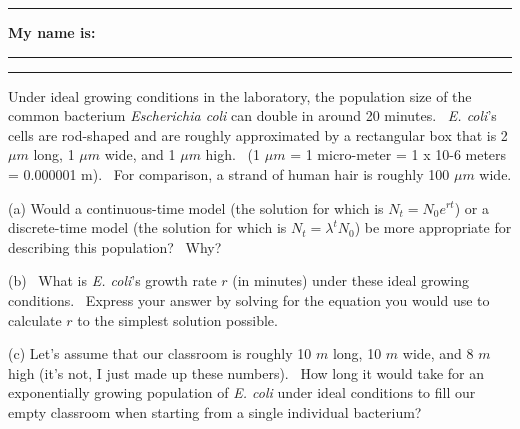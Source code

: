 \documentclass{article}
\newcommand*{\blanks}[1][4em]{\rule{#1}{.4pt}}
\begin{document}
\noindent{}

\rule[0.5ex]{\linewidth}{1pt}
\begin{center}
	\textbf{My name is:} \blanks[150pt]
\end{center}
\rule[0.5ex]{\linewidth}{1pt}

Under ideal growing conditions in the laboratory, the population size of the common bacterium \emph{Escherichia coli} can double in around 20 minutes.  \emph{E. coli}'s cells are rod-shaped and are roughly approximated by a rectangular box that is 2 $\mu m$ long, 1 $\mu m$ wide, and 1 $\mu m$ high.  (1 $\mu m$ = 1 micro-meter = 1 x 10-6 meters = 0.000001 m).  For comparison, a strand of human hair is roughly 100 $\mu m$ wide.

\vspace{1cm}

(a) Would a continuous-time model (the solution for which is $N_t=N_0 e^{rt}$) or a discrete-time model (the solution for which is $N_t = \lambda^t N_0$) be more appropriate for describing this population?  Why?

\vspace{3cm}


\vspace{1cm}

(b)  What is \emph{E. coli}'s growth rate $r$ (in minutes) under these ideal growing conditions.  Express your answer by solving for the equation you would use to calculate $r$ to the simplest solution possible.

\vspace{4cm}

\vspace{1cm}

(c) Let's assume that our classroom is roughly 10 $m$ long, 10 $m$ wide, and 8 $m$ high (it’s not, I just made up these numbers).  How long it would take for an exponentially growing population of \emph{E. coli} under ideal conditions to fill our empty classroom when starting from a single individual bacterium?

\vspace{1cm}
\end{document}
